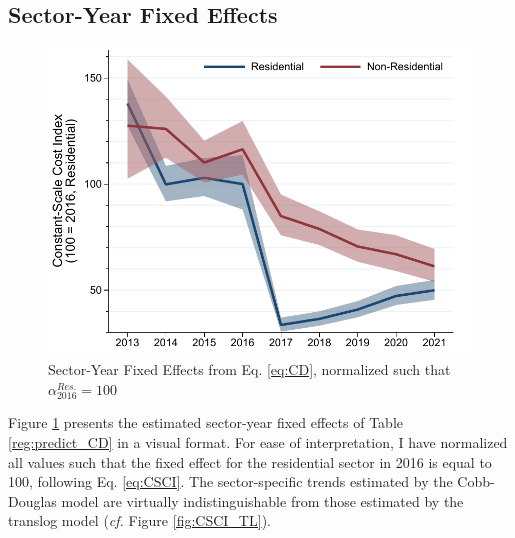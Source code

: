 \subsection{Sector-Year Fixed Effects}\label{apdx:CD_trends}

\begin{figure}[t]
\includegraphics[width=\textwidth]{graphs/CA_SGIP/CSCI_CD.pdf}
\caption{Sector-Year Fixed Effects from Eq. \ref{eq:CD}, normalized such that $\alpha^{Res.}_{2016} = 100$}\label{fig:CSCI_CD}
\end{figure}

Figure \ref{fig:CSCI_CD} presents the estimated sector-year fixed effects of Table \ref{reg:predict_CD} in a visual format. For ease of interpretation, I have normalized all values such that the fixed effect for the residential sector in 2016 is equal to 100, following Eq. \ref{eq:CSCI}. The sector-specific trends estimated by the Cobb-Douglas model are virtually indistinguishable from those estimated by the translog model (\textit{cf.} Figure \ref{fig:CSCI_TL}).